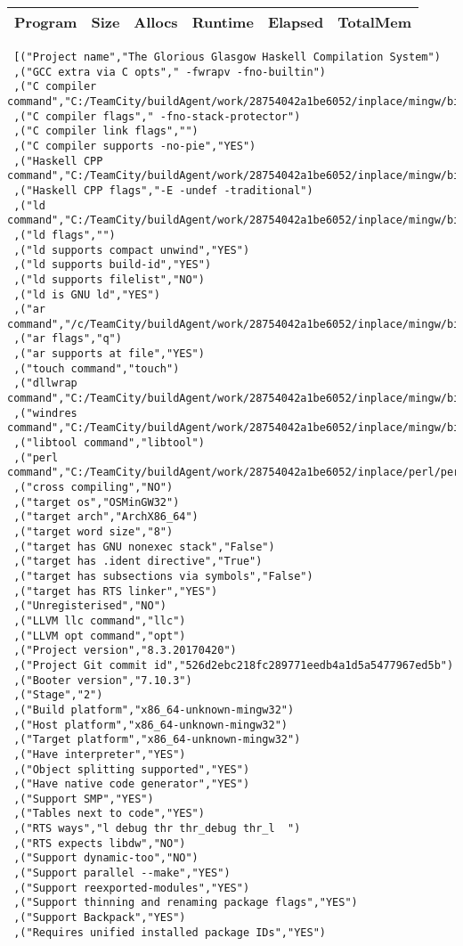 \begin{tabular}{ c c c c c c }
Program & Size & Allocs & Runtime & Elapsed & TotalMem\\
\hline
\end{tabular}
\begin{verbatim}
 [("Project name","The Glorious Glasgow Haskell Compilation System")
 ,("GCC extra via C opts"," -fwrapv -fno-builtin")
 ,("C compiler command","C:/TeamCity/buildAgent/work/28754042a1be6052/inplace/mingw/bin/gcc.exe")
 ,("C compiler flags"," -fno-stack-protector")
 ,("C compiler link flags","")
 ,("C compiler supports -no-pie","YES")
 ,("Haskell CPP command","C:/TeamCity/buildAgent/work/28754042a1be6052/inplace/mingw/bin/gcc.exe")
 ,("Haskell CPP flags","-E -undef -traditional")
 ,("ld command","C:/TeamCity/buildAgent/work/28754042a1be6052/inplace/mingw/bin/ld.exe")
 ,("ld flags","")
 ,("ld supports compact unwind","YES")
 ,("ld supports build-id","YES")
 ,("ld supports filelist","NO")
 ,("ld is GNU ld","YES")
 ,("ar command","/c/TeamCity/buildAgent/work/28754042a1be6052/inplace/mingw/bin/ar")
 ,("ar flags","q")
 ,("ar supports at file","YES")
 ,("touch command","touch")
 ,("dllwrap command","C:/TeamCity/buildAgent/work/28754042a1be6052/inplace/mingw/bin/dllwrap.exe")
 ,("windres command","C:/TeamCity/buildAgent/work/28754042a1be6052/inplace/mingw/bin/windres.exe")
 ,("libtool command","libtool")
 ,("perl command","C:/TeamCity/buildAgent/work/28754042a1be6052/inplace/perl/perl")
 ,("cross compiling","NO")
 ,("target os","OSMinGW32")
 ,("target arch","ArchX86_64")
 ,("target word size","8")
 ,("target has GNU nonexec stack","False")
 ,("target has .ident directive","True")
 ,("target has subsections via symbols","False")
 ,("target has RTS linker","YES")
 ,("Unregisterised","NO")
 ,("LLVM llc command","llc")
 ,("LLVM opt command","opt")
 ,("Project version","8.3.20170420")
 ,("Project Git commit id","526d2ebc218fc289771eedb4a1d5a5477967ed5b")
 ,("Booter version","7.10.3")
 ,("Stage","2")
 ,("Build platform","x86_64-unknown-mingw32")
 ,("Host platform","x86_64-unknown-mingw32")
 ,("Target platform","x86_64-unknown-mingw32")
 ,("Have interpreter","YES")
 ,("Object splitting supported","YES")
 ,("Have native code generator","YES")
 ,("Support SMP","YES")
 ,("Tables next to code","YES")
 ,("RTS ways","l debug thr thr_debug thr_l  ")
 ,("RTS expects libdw","NO")
 ,("Support dynamic-too","NO")
 ,("Support parallel --make","YES")
 ,("Support reexported-modules","YES")
 ,("Support thinning and renaming package flags","YES")
 ,("Support Backpack","YES")
 ,("Requires unified installed package IDs","YES")

\end{verbatim}

